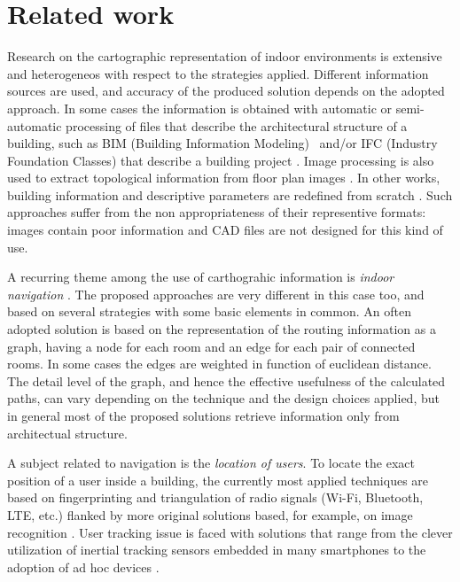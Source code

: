 \section{Related work}\label{related-work}

Research on the cartographic representation of indoor environments is
extensive and heterogeneos with respect to the strategies
applied. Different information sources are used, and accuracy of the
produced solution depends on the adopted approach. In some cases the
information is obtained with automatic or semi-automatic processing of files
that describe the architectural structure of a building, such as BIM (Building Information Modeling)~\cite{Eastman:2008:BHG:1796500} and/or IFC (Industry Foundation Classes) that describe a building project \cite{6816739}. Image processing is also used to
extract topological information from floor plan images \cite{6878152}. In
other works, building information and descriptive parameters are redefined
from scratch \cite{6418876}. Such approaches suffer from the non appropriateness of
their representive formats: images contain poor information and CAD
files are not designed for this kind of use. 

A recurring theme among the use
of carthograhic information is \emph{indoor navigation}
\cite{6878152,6418876,6816739}. The proposed approaches are very different in
this case too, and based on several strategies with some basic elements in
common. An often adopted solution is based on the representation of the
routing information as a graph, having a node for each room and an edge for
each pair of connected rooms. In some cases the edges are weighted in
function of euclidean distance. The detail level of the graph, and hence the
effective usefulness of the calculated paths, can vary depending on the
technique and the design choices applied, but in general most of the proposed
solutions retrieve information only from architectual structure. 

A subject related to navigation is the \emph{location of users}. To locate the exact position of a user inside a
building, the currently most applied techniques are based on fingerprinting and
triangulation of radio signals (Wi-Fi, Bluetooth, LTE, etc.) flanked by more
original solutions based, for example, on image recognition \cite{6815564}.
User tracking issue is faced with solutions that range from the clever
utilization of inertial tracking sensors embedded in many smartphones
\cite{6815564} to the adoption of ad hoc devices \cite{6878152}.


